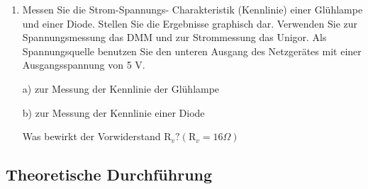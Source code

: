 \documentclass[12pt]{scrartcl}
\begin{document}
\begin{enumerate}
	
	\item
	Messen Sie die Strom-Spannungs-					Charakteristik (Kennlinie) einer 				Glühlampe und einer Diode. Stellen Sie 			die Ergebnisse graphisch dar. Verwenden 			Sie zur Spannungsmessung das DMM und zur 	Strommessung das Unigor. Als 					Spannungsquelle benutzen Sie den unteren 	Ausgang des Netzgerätes mit einer 				Ausgangsspannung von 5 V.
	
	a) zur Messung der Kennlinie der 				Glühlampe
	
	
	b) zur Messung der Kennlinie einer Diode
	
	
	Was bewirkt der Vorwiderstand
	$\text{R}_v? (\text{R}_v= 16\Omega)$
\end{enumerate}


\subsection{Theoretische Durchführung}
\end{document}
